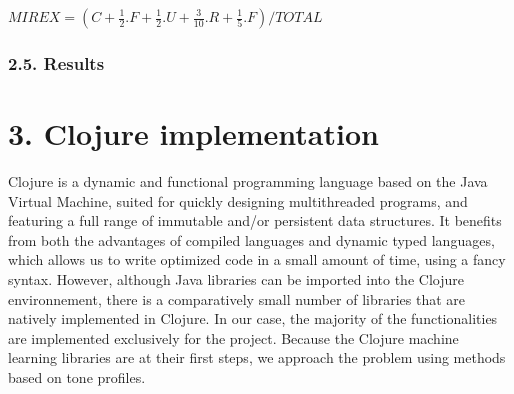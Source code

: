 \documentclass[letterpaper]{article}
\begin{document}
$ MIREX = (C + \frac{1}{2}.F + \frac{1}{2}.U + \frac{3}{10}.R + \frac{1}{5}.F) / TOTAL $

\subsubsection*{2.5. Results}

\FloatBarrier

\begin{table}[h!]
\vskip 0.25cm
\caption{Accuracy assessment, according to the raw accuracy and the MIREX index}
\end{table}

\FloatBarrier

\section{3. Clojure implementation}

Clojure is a dynamic and functional programming language based on the Java Virtual Machine, suited for quickly designing multithreaded programs,
and featuring a full range of immutable and/or persistent data structures. It benefits from both the advantages of compiled languages and dynamic typed
languages, which allows us to write optimized code in a small amount of time, using a fancy syntax. However, although Java libraries can be imported into the Clojure environnement, there is a comparatively small number of libraries that are natively implemented in Clojure. In our case, the majority of the functionalities
are implemented exclusively for the project. Because the Clojure machine learning libraries are at their first steps, we approach the problem using methods based
on tone profiles.
\end{document}
